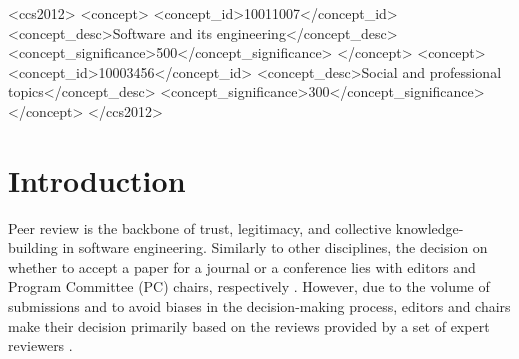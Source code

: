 \documentclass[sigconf]{acmart}
\begin{document}
\begin{CCSXML}
<ccs2012>
   <concept>
       <concept_id>10011007</concept_id>
       <concept_desc>Software and its engineering</concept_desc>
       <concept_significance>500</concept_significance>
       </concept>
   <concept>
       <concept_id>10003456</concept_id>
       <concept_desc>Social and professional topics</concept_desc>
       <concept_significance>300</concept_significance>
       </concept>
 </ccs2012>
\end{CCSXML}



\maketitle

\section{Introduction}

Peer review is the backbone of trust, legitimacy, and collective knowledge-building in software engineering. Similarly to other disciplines, the decision on whether to accept a paper for a journal or a conference lies with editors and Program Committee (PC) chairs, respectively \cite{Lin2023}. However, due to the volume of submissions and to avoid biases in the decision-making process, editors and chairs make their decision primarily based on the reviews provided by a set of expert reviewers \cite{Lin2023}.
\end{document}
